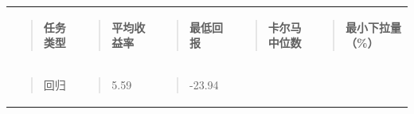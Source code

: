\documentclass[UTF8]{ctexart}
\newcounter{none} %
\begin{document}
{\def\LTcaptype{none} %
\begin{longtable}[]{@{}
  >{\raggedright\arraybackslash}p{}
  >{\raggedright\arraybackslash}p{}
  >{\raggedright\arraybackslash}p{}
  >{\raggedright\arraybackslash}p{}
  >{\raggedright\arraybackslash}p{}@{}}
\toprule\noalign{}
\endhead
\bottomrule\noalign{}
\endlastfoot
\begin{minipage}[t]{\linewidth}\raggedright
\begin{quote}
\textbf{任务类型}
\end{quote}
\end{minipage} & \begin{minipage}[t]{\linewidth}\raggedright
\begin{quote}
\textbf{平均收益率}
\end{quote}
\end{minipage} & \begin{minipage}[t]{\linewidth}\raggedright
\begin{quote}
\textbf{最低回报}
\end{quote}
\end{minipage} & \begin{minipage}[t]{\linewidth}\raggedright
\begin{quote}
\textbf{卡尔马中位数}
\end{quote}
\end{minipage} & \begin{minipage}[t]{\linewidth}\raggedright
\begin{quote}
\textbf{最小下拉量（\%）}
\end{quote}
\end{minipage} \\
\begin{minipage}[t]{\linewidth}\raggedright
\begin{quote}
回归
\end{quote}
\end{minipage} & \begin{minipage}[t]{\linewidth}\raggedright
\begin{quote}
5.59
\end{quote}
\end{minipage} & \begin{minipage}[t]{\linewidth}\raggedright
\begin{quote}
-23.94
\end{quote}

\end{minipage}
\end{longtable}}
\end{document}
